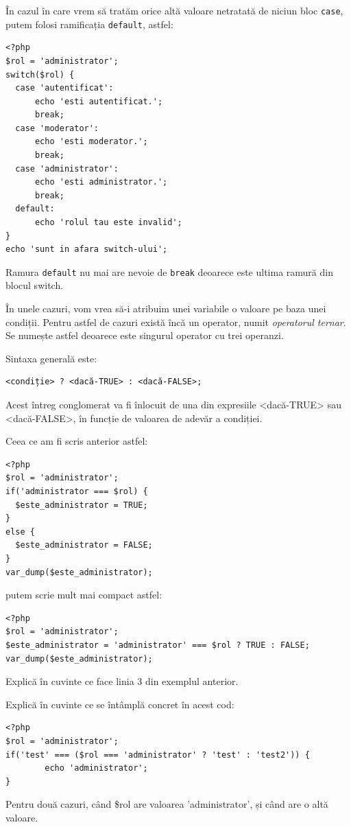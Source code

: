 În cazul în care vrem să tratăm orice altă
valoare netratată de niciun bloc \texttt{case}, putem
folosi ramificația \texttt{default}, astfel:

\begin{lstlisting}
<?php
$rol = 'administrator';
switch($rol) {
  case 'autentificat':
	  echo 'esti autentificat.';
	  break;
  case 'moderator':
	  echo 'esti moderator.';
	  break;
  case 'administrator':
	  echo 'esti administrator.';
	  break;
  default:
	  echo 'rolul tau este invalid';
}
echo 'sunt in afara switch-ului';
\end{lstlisting}
Ramura \texttt{default} nu mai are nevoie de \texttt{break} deoarece
este ultima ramură din blocul switch.


În unele cazuri, vom vrea să-i atribuim unei variabile o valoare
pe baza unei condiții. Pentru astfel de cazuri există încă un
operator, numit \textsl{operatorul ternar}. Se numește astfel deoarece
este singurul operator cu trei operanzi.

Sintaxa generală este:
\begin{verbatim}
<condiție> ? <dacă-TRUE> : <dacă-FALSE>;
\end{verbatim}
Acest întreg {\glqq}conglomerat{\grqq} va fi înlocuit de
una din expresiile <dacă-TRUE> sau <dacă-FALSE>,
în funcție de valoarea de adevăr a condiției.


Ceea ce am fi scris anterior astfel:
\begin{lstlisting}
<?php
$rol = 'administrator';
if('administrator === $rol) {
  $este_administrator = TRUE;
}
else {
  $este_administrator = FALSE;
}
var_dump($este_administrator);
\end{lstlisting}
putem scrie mult mai compact astfel:
\begin{lstlisting}
<?php
$rol = 'administrator';
$este_administrator = 'administrator' === $rol ? TRUE : FALSE;
var_dump($este_administrator);
\end{lstlisting}
\begin{Exercise}[title={Înțelegerea operatorului ternar},difficulty=2]
\ExePart
Explică în cuvinte ce face linia 3 din exemplul anterior.

\ExePart
Explică în cuvinte ce se întâmplă concret în acest cod:
\begin{lstlisting}
<?php
$rol = 'administrator';
if('test' === ($rol === 'administrator' ? 'test' : 'test2')) {
        echo 'administrator';
}
\end{lstlisting}
Pentru două cazuri, când \$rol are valoarea 'administrator', și când
are o altă valoare.
\end{Exercise}

